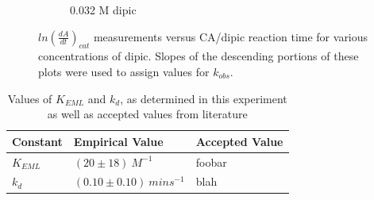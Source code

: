 \begin{figure}[h]
\begin{subfigure}{0.5\textwidth}
                \caption{0.032 M dipic}
                \label{fig:0.032M_dipic_readings}
        \end{subfigure}
        \caption{$ln \left(\frac{dA}{dt}\right)_{cat}$ measurements versus CA/dipic reaction time for various concentrations of dipic. Slopes of the descending portions of these plots were used to assign values for $k_{obs}$.}\label{fig:kobs_results}
\end{figure}

\begin{table}[h]
    \begin{tabular}{| l | l | l |}
    \hline
    Constant & Empirical Value & Accepted Value \\ \hline
    $K_{EML}$ & $(20\pm{18}){\ }M^{-1}$ & foobar \\ \hline
    $k_{d}$ & $(0.10\pm{0.10}){\ }mins^{-1}$ & blah \\ 
    \hline
    \end{tabular}
    \caption[Table caption text]{Values of $K_{EML}$ and $k_d$, as determined in this experiment as well as accepted values from literature}
    \label{tbl:summary}
\end{table}